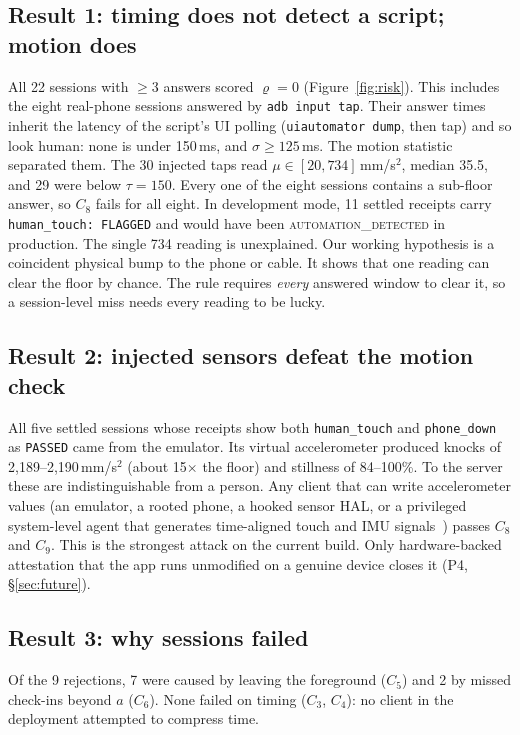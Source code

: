 \documentclass[10pt]{article}
\newcommand{\code}[1]{\texttt{\small #1}}
\begin{document}
\subsection{Result 1: timing does not detect a script; motion does}
All 22 sessions with $\ge3$ answers scored $\varrho=0$ (Figure~\ref{fig:risk}). This includes the eight real-phone
sessions answered by \code{adb input tap}. Their answer times inherit the latency of the script's UI polling
(\code{uiautomator dump}, then tap) and so look human: none is under 150\,ms, and $\sigma\ge125$\,ms. The motion statistic
separated them. The 30 injected taps read $\mu\in[20,734]$\,mm/s$^2$, median 35.5, and 29 were below $\tau=150$. Every one
of the eight sessions contains a sub-floor answer, so $C_8$ fails for all eight. In development mode, 11 settled receipts
carry \code{human\_touch: FLAGGED} and would have been \textsc{automation\_detected} in production. The single 734 reading
is unexplained. Our working hypothesis is a coincident physical bump to the phone or cable. It shows that one reading
can clear the floor by chance. The rule requires \emph{every} answered window to clear it, so a session-level miss needs
every reading to be lucky.

\subsection{Result 2: injected sensors defeat the motion check}
All five settled sessions whose receipts show both \code{human\_touch} and \code{phone\_down} as \code{PASSED} came from
the emulator. Its virtual accelerometer produced knocks of 2,189--2,190\,mm/s$^2$ (about 15$\times$ the floor) and
stillness of 84--100\%. To the server these are indistinguishable from a person. Any client that can write accelerometer
values (an emulator, a rooted phone, a hooked sensor HAL, or a privileged system-level agent that generates time-aligned
touch and IMU signals~\cite{actreal2026}) passes $C_8$ and $C_9$. This is the strongest attack on the current build.
Only hardware-backed attestation that the app runs unmodified on a genuine device closes it (P4, \S\ref{sec:future}).

\subsection{Result 3: why sessions failed}
Of the 9 rejections, 7 were caused by leaving the foreground ($C_5$) and 2 by missed check-ins beyond $a$ ($C_6$). None
failed on timing ($C_3$, $C_4$): no client in the deployment attempted to compress time.
\end{document}
